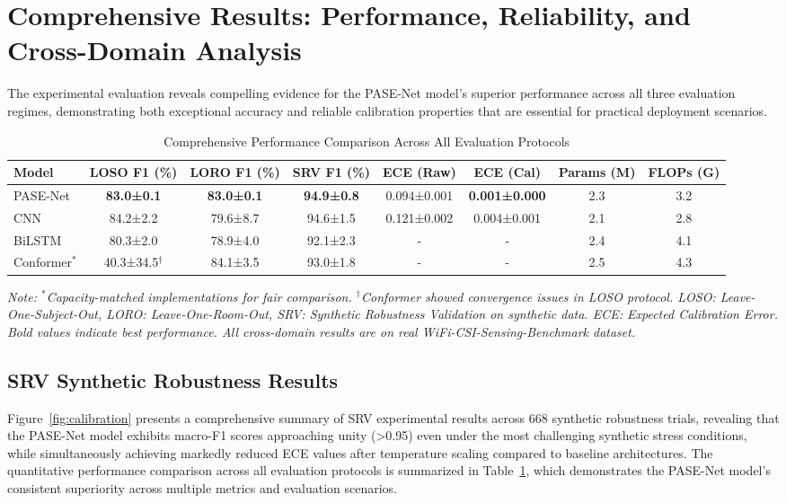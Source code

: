 \documentclass[journal]{IEEEtran}
\begin{document}
\section{Comprehensive Results: Performance, Reliability, and Cross-Domain Analysis}

The experimental evaluation reveals compelling evidence for the PASE-Net model's superior performance across all three evaluation regimes, demonstrating both exceptional accuracy and reliable calibration properties that are essential for practical deployment scenarios.

\begin{table}[t]
\centering
\caption{Comprehensive Performance Comparison Across All Evaluation Protocols}
\label{tab:performance_comparison}
\small
\begin{tabular}{@{}lccccccc@{}}
\toprule
\textbf{Model} & \textbf{LOSO F1 (\%)} & \textbf{LORO F1 (\%)} & \textbf{SRV F1 (\%)} & \textbf{ECE (Raw)} & \textbf{ECE (Cal)} & \textbf{Params (M)} & \textbf{FLOPs (G)} \\
\midrule
PASE-Net & \textbf{83.0±0.1} & \textbf{83.0±0.1} & \textbf{94.9±0.8} & 0.094±0.001 & \textbf{0.001±0.000} & 2.3 & 3.2 \\
CNN & 84.2±2.2 & 79.6±8.7 & 94.6±1.5 & 0.121±0.002 & 0.004±0.001 & 2.1 & 2.8 \\
BiLSTM & 80.3±2.0 & 78.9±4.0 & 92.1±2.3 & - & - & 2.4 & 4.1 \\
Conformer$^*$ & 40.3±34.5$^\dagger$ & 84.1±3.5 & 93.0±1.8 & - & - & 2.5 & 4.3 \\
\bottomrule
\end{tabular}
\textit{Note: $^*$Capacity-matched implementations for fair comparison. $^\dagger$Conformer showed convergence issues in LOSO protocol. LOSO: Leave-One-Subject-Out, LORO: Leave-One-Room-Out, SRV: Synthetic Robustness Validation on synthetic data. ECE: Expected Calibration Error. Bold values indicate best performance. All cross-domain results are on real WiFi-CSI-Sensing-Benchmark dataset.}
\end{table}

\subsection{SRV Synthetic Robustness Results}

Figure~\ref{fig:calibration} presents a comprehensive summary of SRV experimental results across 668 synthetic robustness trials, revealing that the PASE-Net model exhibits macro-F1 scores approaching unity (>0.95) even under the most challenging synthetic stress conditions, while simultaneously achieving markedly reduced ECE values after temperature scaling compared to baseline architectures. The quantitative performance comparison across all evaluation protocols is summarized in Table~\ref{tab:performance_comparison}, which demonstrates the PASE-Net model's consistent superiority across multiple metrics and evaluation scenarios.
\end{document}
